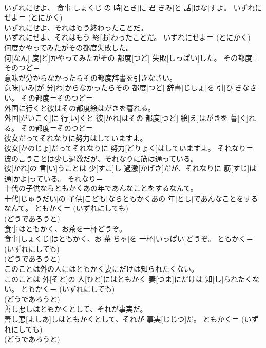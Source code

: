 \documentclass[8pt]{extreport}
\begin{document}
\begin{CJK}{UTF8}{min}
{\\	いずれにせよ、 食事[しょくじ]の 時[とき]に 君[きみ]と 話[はな]すよ。	いずれにせよ＝ (とにかく) 
\\	いずれにせよ、それはもう終わったことだ。	
\\	いずれにせよ、それはもう 終[お]わったことだ。	いずれにせよ＝ (とにかく) 
\\	何度かやってみたがその都度失敗した。	
\\	何[なん] 度[ど]かやってみたがその 都度[つど] 失敗[しっぱい]した。	その都度＝そのつど＝ 
\\	意味が分からなかったらその都度辞書を引きなさい。	
\\	意味[いみ]が 分[わ]からなかったらその 都度[つど] 辞書[じしょ]を 引[ひ]きなさい。	その都度＝そのつど＝ 
\\	外国に行くと彼はその都度絵はがきを暮れる。	
\\	外国[がいこく]に 行[い]くと 彼[かれ]はその 都度[つど] 絵[え]はがきを 暮[く]れる。	その都度＝そのつど＝ 
\\	彼女だってそれなりに努力はしていますよ。	
\\	彼女[かのじょ]だってそれなりに 努力[どりょく]はしていますよ。	それなり＝ 
\\	彼の言うことは少し過激だが、それなりに筋は通っている。	
\\	彼[かれ]の 言[い]うことは 少[すこ]し 過激[かげき]だが、それなりに 筋[すじ]は 通[かよ]っている。	それなり＝ 
\\	十代の子供ならともかくあの年であんなことをするなんて。	
\\	十代[じゅうだい]の 子供[こども]ならともかくあの 年[とし]であんなことをするなんて。	ともかく＝ (いずれにしても) 
\\	(どうであろうと) 
\\	食事はともかく、お茶を一杯どうぞ。	
\\	食事[しょくじ]はともかく、お 茶[ちゃ]を 一杯[いっぱい]どうぞ。	ともかく＝ (いずれにしても) 
\\	(どうであろうと) 
\\	このことは外の人にはともかく妻にだけは知られたくない。	
\\	このことは 外[そと]の 人[ひと]にはともかく 妻[つま]にだけは 知[し]られたくない。	ともかく＝ (いずれにしても) 
\\	(どうであろうと) 
\\	善し悪しはともかくとして、それが事実だ。	
\\	善し悪[よしあ]しはともかくとして、それが 事実[じじつ]だ。	ともかく＝ (いずれにしても) 
\\	(どうであろうと) 
}
\end{CJK}
\end{document}
